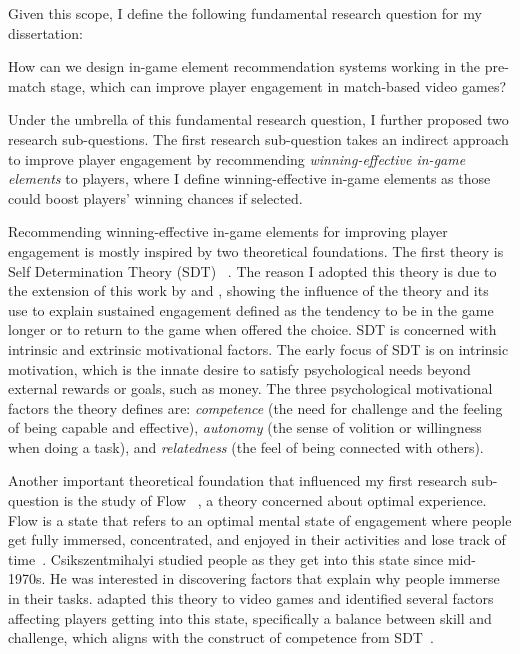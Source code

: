 Given this scope, I define the following fundamental research question for my dissertation:


\begin{displayquote}
How can we design in-game element recommendation systems working in the pre-match stage, which can improve player engagement in match-based video games?
\end{displayquote}


Under the umbrella of this fundamental research question, I further proposed two research sub-questions. The first research sub-question takes an indirect approach to improve player engagement by recommending \textit{winning-effective in-game elements} to players, where I define winning-effective in-game elements as those could boost players' winning chances if selected. 

Recommending winning-effective in-game elements for improving player engagement is mostly inspired by two theoretical foundations. The first theory is Self Determination Theory (SDT) ~\citep{ryan2006motivational,przybylski2010motivational,yee2006motivations,wu2010falling,sherry2006video,lazzaro2004we,schoenau2011player}. The reason I adopted this theory is due to the extension of this work by \textcite{przybylski2010motivational} and \textcite{ryan2006motivational}, showing the influence of the theory and its use to explain sustained engagement defined as the tendency to be in the game longer or to return to the game when offered the choice. SDT is concerned with intrinsic and extrinsic motivational factors. The early focus of SDT is on intrinsic motivation, which is the innate desire to satisfy psychological needs beyond external rewards or goals, such as money. The three psychological motivational factors the theory defines are: \textit{competence} (the need for challenge and the feeling of being capable and effective), \textit{autonomy} (the sense of volition or willingness when doing a task), and \textit{relatedness} (the feel of being connected with others). 

Another important theoretical foundation that influenced my first research sub-question is the study of Flow ~\citep{flow1990psychology}, a theory concerned about optimal experience. Flow is a state that refers to an optimal mental state of engagement where people get fully immersed, concentrated, and enjoyed in their activities and lose track of time~\citep{flow1990psychology}. Csikszentmihalyi studied people as they get into this state since mid-1970s. He was interested in discovering factors that explain why people immerse in their tasks. \textcite{sweetser2005gameflow} adapted this theory to video games and identified several factors affecting players getting into this state, specifically a balance between skill and challenge, which aligns with the construct of competence from SDT~\citep{ryan2000self}. 

